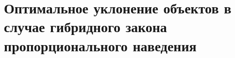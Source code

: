 \documentclass[a4paper,12pt, openany]{book}
\theoremstyle{plain} %
\theoremstyle{definition} %
\theoremstyle{remark} %
\numberwithin{equation}{chapter}
\begin{document}
{%







\newpage

\chapter{Оптимальное уклонение объектов в случае гибридного закона пропорционального наведения}

}
\end{document}
